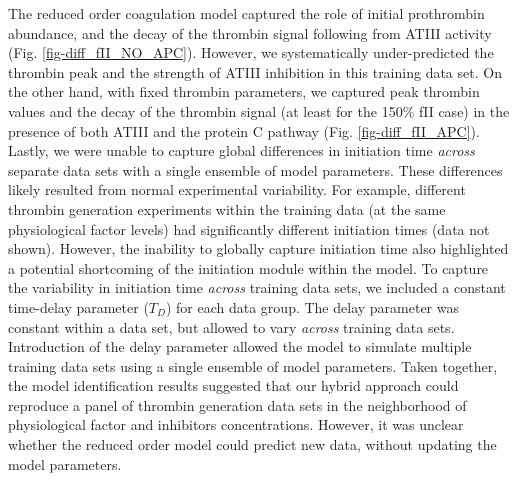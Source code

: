 \documentclass[12pt]{article}
\begin{document}
The reduced order coagulation model captured the role of initial prothrombin abundance, and the decay of the thrombin signal following from ATIII activity (Fig. \ref{fig-diff_fII_NO_APC}).
However, we systematically under-predicted the thrombin peak and the strength of ATIII inhibition in this training data set.
On the other hand, with fixed thrombin parameters, we captured peak thrombin values and the decay of the thrombin signal (at least for the 150\% fII case) in the presence
of both ATIII and the protein C pathway (Fig. \ref{fig-diff_fII_APC}). Lastly, we were unable to capture global differences in initiation time \textit{across} separate data 
sets with a single ensemble of model parameters. These differences likely resulted from normal experimental variability.
For example, different thrombin generation experiments within the 
training data (at the same physiological factor levels) had significantly different initiation times (data not shown). 
However, the inability to globally capture initiation time also highlighted a potential shortcoming of the initiation module within the model. 
To capture the variability in initiation time \textit{across} training data sets, we included a constant time-delay parameter ($T_{D}$) for each data group.
The delay parameter was constant within a data set, but allowed to vary \textit{across} training data sets. 
Introduction of the delay parameter allowed the model to simulate multiple training data sets using a single ensemble of model parameters.
Taken together, the model identification results suggested 
that our hybrid approach could reproduce a panel of thrombin generation data sets in the neighborhood of physiological factor and inhibitors concentrations.
However, it was unclear whether the reduced order model could predict new data, without updating the model parameters.
\end{document}
